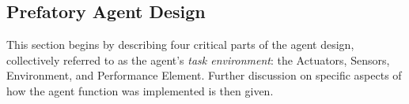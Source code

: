 \subsection{Prefatory Agent Design}\label{subsection:intial_agent_design}

This section begins by describing four critical parts of the agent design, collectively referred to as the agent's \textit{task environment}: the Actuators, Sensors, Environment, and Performance Element. Further discussion on specific aspects of how the agent function was implemented is then given.

